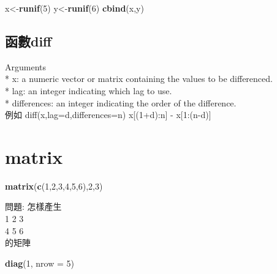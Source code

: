 \documentclass[]{book}
\newenvironment{Shaded}{\begin{snugshade}}{\end{snugshade}}
\newcommand{\DataTypeTok}[1]{\textcolor[rgb]{0.13,0.29,0.53}{#1}}
\newcommand{\DecValTok}[1]{\textcolor[rgb]{0.00,0.00,0.81}{#1}}
\newcommand{\KeywordTok}[1]{\textcolor[rgb]{0.13,0.29,0.53}{\textbf{#1}}}
\newcommand{\NormalTok}[1]{#1}
\theoremstyle{definition}
\theoremstyle{definition}
\theoremstyle{definition}
\theoremstyle{remark}
\begin{document}
\begin{Shaded}
\begin{Highlighting}[]
\NormalTok{x<-}\KeywordTok{runif}\NormalTok{(}\DecValTok{5}\NormalTok{)}
\NormalTok{y<-}\KeywordTok{runif}\NormalTok{(}\DecValTok{6}\NormalTok{)}
\KeywordTok{cbind}\NormalTok{(x,y)}
\end{Highlighting}
\end{Shaded}

\hypertarget{diff}{%
\subsection{函數diff}\label{diff}}

Arguments\\
* x: a numeric vector or matrix containing the values to be
differenced.\\
* lag: an integer indicating which lag to use.\\
* differences: an integer indicating the order of the difference.\\
例如 diff(x,lag=d,differences=n) x{[}(1+d):n{]} - x{[}1:(n-d){]}

\hypertarget{matrix}{%
\section{matrix}\label{matrix}}

\begin{Shaded}
\begin{Highlighting}[]
\KeywordTok{matrix}\NormalTok{(}\KeywordTok{c}\NormalTok{(}\DecValTok{1}\NormalTok{,}\DecValTok{2}\NormalTok{,}\DecValTok{3}\NormalTok{,}\DecValTok{4}\NormalTok{,}\DecValTok{5}\NormalTok{,}\DecValTok{6}\NormalTok{),}\DecValTok{2}\NormalTok{,}\DecValTok{3}\NormalTok{)}
\end{Highlighting}
\end{Shaded}

問題: 怎樣產生\\
1 2 3\\
4 5 6\\
的矩陣

\begin{Shaded}
\begin{Highlighting}[]
\KeywordTok{diag}\NormalTok{(}\DecValTok{1}\NormalTok{, }\DataTypeTok{nrow =} \DecValTok{5}\NormalTok{)}
\end{Highlighting}
\end{Shaded}
\end{document}
